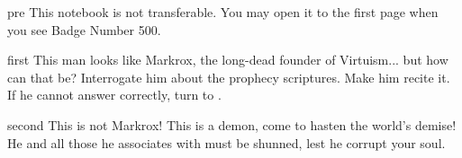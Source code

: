 \documentclass[notebook]{guildcamp1} %
\begin{document}
\startnotebook{\nDoubter{}}

\begin{page}{pre}
This notebook is not transferable. You may open it to the first page when you see Badge Number 500.
\end{page}

\begin{page}{first}
This man looks like Markrox, the long-dead founder of Virtuism... but how can that be? Interrogate him about the prophecy scriptures. Make him recite it.  If he cannot answer correctly, turn to .
\end{page}

\begin{page}{second}
This is not Markrox! This is a demon, come to hasten the world's demise! He and all those he associates with must be shunned, lest he corrupt your soul.
\end{page}

\endnotebook
\end{document}
